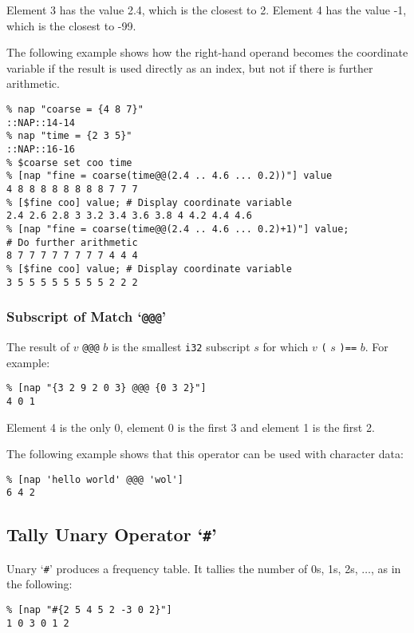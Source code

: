 Element 3 has the value 2.4, which is the closest to 2. Element 4
has the value -1, which is the closest to -99.
  \par The following example shows how the right-hand operand becomes the
  coordinate variable if the result is used directly as an index, but
  not if there is further arithmetic.
  \begin{verbatim}
% nap "coarse = {4 8 7}"
::NAP::14-14
% nap "time = {2 3 5}"
::NAP::16-16
% $coarse set coo time
% [nap "fine = coarse(time@@(2.4 .. 4.6 ... 0.2))"] value
4 8 8 8 8 8 8 8 8 7 7 7
% [$fine coo] value; # Display coordinate variable
2.4 2.6 2.8 3 3.2 3.4 3.6 3.8 4 4.2 4.4 4.6
% [nap "fine = coarse(time@@(2.4 .. 4.6 ... 0.2)+1)"] value;
# Do further arithmetic
8 7 7 7 7 7 7 7 7 4 4 4
% [$fine coo] value; # Display coordinate variable
3 5 5 5 5 5 5 5 5 2 2 2
\end{verbatim}

  \subsubsection{
    \label{Subscript:of:Match}Subscript of Match `\texttt{@@@}'
  }

  \par The result of 
  $v$
  \texttt{@@@}
  $b$ is the smallest 
  \texttt{i32} subscript 
  $s$ for which 
  $v$
  \texttt{(}
  $s$
  \texttt{)==}
  $b$. For example:
  \begin{verbatim}
% [nap "{3 2 9 2 0 3} @@@ {0 3 2}"]
4 0 1
\end{verbatim}

  \par Element 4 is the only 0, element 0 is the first 3 and element 1 is
  the first 2.
  \par The following example shows that this operator can be used with
  character data:
  \begin{verbatim}
% [nap 'hello world' @@@ 'wol']
6 4 2
\end{verbatim}

  \subsection{
    \label{Tally}Tally Unary Operator `\texttt{\#}'
  }

  \par Unary `\texttt{\#}' produces a frequency table. It tallies the
  number of 0s, 1s, 2s, $\ldots$, as in the following:
  \begin{verbatim}
% [nap "#{2 5 4 5 2 -3 0 2}"]
1 0 3 0 1 2
\end{verbatim}

